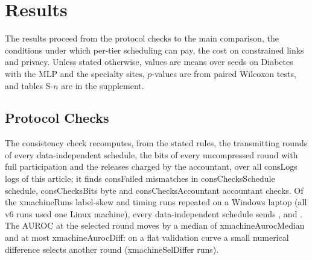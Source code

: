 \section{Results}
\label{sec:results}

The results proceed from the protocol checks to the main comparison, the conditions under which per-tier scheduling can pay, the cost on constrained links and privacy. Unless stated otherwise, values are means over seeds on Diabetes with the MLP and the specialty sites, $p$-values are from paired Wilcoxon tests, and tables S-$n$ are in the supplement.

\subsection{Protocol Checks}
\label{sec:results-check}
The consistency check recomputes, from the stated rules, the transmitting rounds of every data-independent schedule, the bits of every uncompressed round with full participation and the releases charged by the accountant, over all \num{consLogs} logs of this article; it finds \num{consFailed} mismatches in \num{consChecksSchedule} schedule, \num{consChecksBits} byte and \num{consChecksAccountant} accountant checks. Of the \num{xmachineRuns} label-skew and timing runs repeated on a Windows laptop (all v6 runs used one Linux machine), every data-independent schedule sends , and . The AUROC at the selected round moves by a median of \num{xmachineAurocMedian} and at most \num{xmachineAurocDiff}: on a flat validation curve a small numerical difference selects another round (\num{xmachineSelDiffer} runs). 

\begin{table}[t]
\caption{Main comparison on the 20 specialty sites (MLP, 10 seeds): $A^{\mathcal T}(\hat r)$ with bootstrap 95\% interval; upload over 60 rounds and up to $\hat r$; mean over the last ten rounds and over the post-synchronisation rounds of the last twenty (Phase); final model after three local epochs (+FT 3); ECE without and with Platt scaling; worst-site AUROC; $\Delta$ and $p$ against FedPer}
\label{tab:main}
\centering\footnotesize
{}
\end{table}


